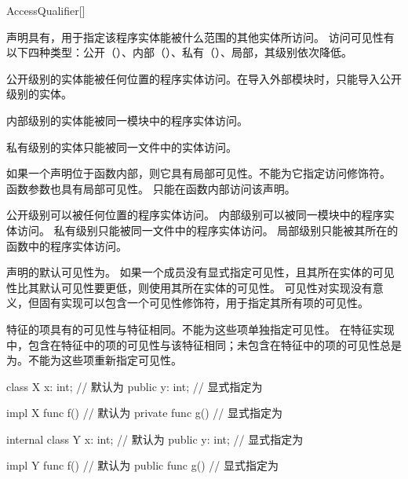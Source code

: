 \begin{bnf}{AccessQualifier}[\oneof]
\end{bnf}

\pnum
声明具有，用于指定该程序实体能被什么范围的其他实体所访问。
访问可见性有以下四种类型：公开（）、内部（）、私有（）、局部，其级别依次降低。

\pnum
公开级别的实体能被任何位置的程序实体访问。在导入外部模块时，只能导入公开级别的实体。

\pnum
内部级别的实体能被同一模块中的程序实体访问。

\pnum
私有级别的实体只能被同一文件中的实体访问。

\pnum
如果一个声明位于函数内部，则它具有局部可见性。不能为它指定访问修饰符。
函数参数也具有局部可见性。
只能在函数内部访问该声明。

公开级别可以被任何位置的程序实体访问。
内部级别可以被同一模块中的程序实体访问。
私有级别只能被同一文件中的程序实体访问。
局部级别只能被其所在的函数中的程序实体访问。

\pnum
声明的默认可见性为。
如果一个成员没有显式指定可见性，且其所在实体的可见性比其默认可见性要更低，则使用其所在实体的可见性。
可见性对实现没有意义，但固有实现可以包含一个可见性修饰符，用于指定其所有项的可见性。

\pnum
特征的项具有的可见性与特征相同。不能为这些项单独指定可见性。
在特征实现中，包含在特征中的项的可见性与该特征相同；未包含在特征中的项的可见性总是为。不能为这些项重新指定可见性。

\enterexample
\begin{codeblock}
class X {
    x: int; // 默认为
    public y: int; // 显式指定为
}

impl X {
    func f() {} // 默认为
    private func g() {} // 显式指定为
}

internal class Y {
    x: int; // 默认为
    public y: int; // 显式指定为
}

impl Y {
    func f() {} // 默认为
    public func g() {} // 显式指定为
}
\end{codeblock}